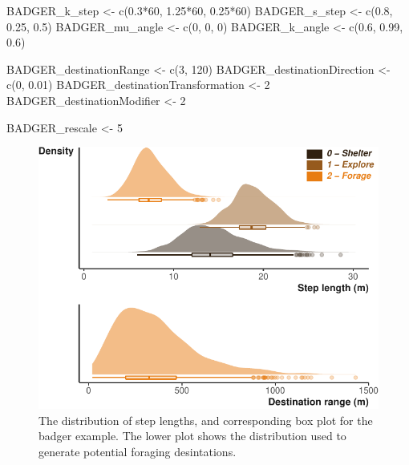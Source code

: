 \documentclass[10pt,a4paper]{article}
\newenvironment{Shaded}{}{}
\newcommand{\DecValTok}[1]{#1}
\newcommand{\FloatTok}[1]{#1}
\newcommand{\FunctionTok}[1]{#1}
\newcommand{\NormalTok}[1]{#1}
\newcommand{\OtherTok}[1]{#1}
\newcommand{\SpecialCharTok}[1]{#1}
\begin{document}
\begin{Shaded}
\begin{Highlighting}[]
\NormalTok{BADGER\_k\_step }\OtherTok{\textless{}{-}} \FunctionTok{c}\NormalTok{(}\FloatTok{0.3}\SpecialCharTok{*}\DecValTok{60}\NormalTok{, }\FloatTok{1.25}\SpecialCharTok{*}\DecValTok{60}\NormalTok{, }\FloatTok{0.25}\SpecialCharTok{*}\DecValTok{60}\NormalTok{)}
\NormalTok{BADGER\_s\_step }\OtherTok{\textless{}{-}} \FunctionTok{c}\NormalTok{(}\FloatTok{0.8}\NormalTok{, }\FloatTok{0.25}\NormalTok{, }\FloatTok{0.5}\NormalTok{)}
\NormalTok{BADGER\_mu\_angle }\OtherTok{\textless{}{-}} \FunctionTok{c}\NormalTok{(}\DecValTok{0}\NormalTok{, }\DecValTok{0}\NormalTok{, }\DecValTok{0}\NormalTok{)}
\NormalTok{BADGER\_k\_angle }\OtherTok{\textless{}{-}} \FunctionTok{c}\NormalTok{(}\FloatTok{0.6}\NormalTok{, }\FloatTok{0.99}\NormalTok{, }\FloatTok{0.6}\NormalTok{)}

\NormalTok{BADGER\_destinationRange }\OtherTok{\textless{}{-}} \FunctionTok{c}\NormalTok{(}\DecValTok{3}\NormalTok{, }\DecValTok{120}\NormalTok{)}
\NormalTok{BADGER\_destinationDirection }\OtherTok{\textless{}{-}} \FunctionTok{c}\NormalTok{(}\DecValTok{0}\NormalTok{, }\FloatTok{0.01}\NormalTok{)}
\NormalTok{BADGER\_destinationTransformation }\OtherTok{\textless{}{-}} \DecValTok{2}
\NormalTok{BADGER\_destinationModifier }\OtherTok{\textless{}{-}} \DecValTok{2}

\NormalTok{BADGER\_rescale }\OtherTok{\textless{}{-}} \DecValTok{5}
\end{Highlighting}
\end{Shaded}

\begin{figure}

{\centering \includegraphics{Agent-based_model_walkthrough_files/figure-latex/BADGERsettingMoveDesPlot-1} 

}

\caption{The distribution of step lengths, and corresponding box plot for the badger example. The lower plot shows the distribution used to generate potential foraging desintations.}\label{fig:BADGERsettingMoveDesPlot}
\end{figure}
\end{document}
